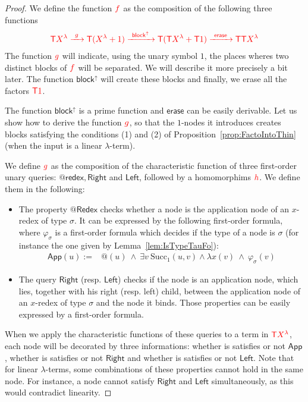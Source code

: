 \begin{proof}
We define the function ${\color{red}{f}}$ as the composition of the following three functions
\begin{align*}
{\color{red}{{\color{red}{\mathsf T}}{\color{red}{X^\lambda}} \xrightarrow{\ g\ } {\color{red}{\mathsf T}}({\color{red}{X^\lambda}}+1) \xrightarrow{\ \mathsf{block}^\uparrow\ } {\color{red}{\mathsf T}}({\color{red}{\mathsf T}}{\color{red}{X^\lambda}}+{\color{red}{\mathsf T}}1)
\xrightarrow{\ \mathsf{erase}\ } {\color{red}{\mathsf T}}{\color{red}{\mathsf T}}{\color{red}{X^\lambda}}}}
\end{align*}
The function ${\color{red}{g}}$ will indicate, using the unary symbol $1$, the places wheres two distinct blocks of ${\color{red}{f}}$ will be separated. We will describe it more precisely a bit later. The function $\mathsf{block}^\uparrow$ will create these blocks and finally, we erase all the factors ${\color{red}{{\color{red}{\mathsf T}}1}}$.

The function $\mathsf{block}^\uparrow$ is a prime function and  $\mathsf{erase}$ can be easily derivable. 
Let us show how to derive the function ${\color{red}{g}}$, so that the $1$-nodes it introduces creates blocks satisfying the conditions (1) and (2) of Proposition~\ref{prop:FactoIntoThin} (when the input is a linear $\lambda$-term).  

We define ${\color{red}{g}}$ as the composition of the characteristic function of three first-order unary queries: $\mathsf{@redex}, \mathsf{Right}$ and $\mathsf{Left}$, followed by a homomorphims ${\color{red}{h}}$. We define them in the following:
\begin{itemize}
\item The property $\mathsf{@Redex}$ checks whether a node is the application node of an $x$-redex of type $\sigma$. It can be expressed by the following first-order formula, where  $\varphi_\sigma$ is a first-order formula which decides if the type of a node is $\sigma$ (for instance the one given by Lemma~\ref{lem:IsTypeTauFo}):
\begin{align*} \mathsf{App}( u ):=& \mathsf{@}(u)\ \wedge\ \exists v\  \mathrm{Succ}_1(u, v) \wedge \lambda x(v)\ \wedge\ \varphi_\sigma(v)
\end{align*} 
\item The query $\mathsf{Right}$ (resp. $\mathsf{Left}$) checks if the node is an application node, which lies, together with his right (resp. left) child, between the application node of an $x$-redex of type $\sigma$ and the node it binds. Those properties can be easily expressed by a first-order formula.
\end{itemize}

When we apply the characteristic functions of these queries to a term in ${\color{red}{{\color{red}{\mathsf T}}X^\lambda}}$, each node will be decorated by three informations: whether is satisfies or not $\mathsf{App}$,  whether is satisfies or not $\mathsf{Right}$ and whether is satisfies or not $\mathsf{Left}$. Note that for linear $\lambda$-terms, some combinations of these properties cannot hold in the same node. For instance, a node cannot satisfy $\mathsf{Right}$ and $\mathsf{Left}$ simultaneously, as this would contradict linearity. 


\end{proof}
